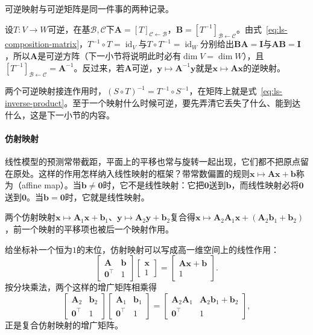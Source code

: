 可逆映射与可逆矩阵是同一件事的两种记录。

设$T:V\to W$可逆，在基$\mathcal B,\mathcal C$下$\bm A=[T]_{\mathcal C\leftarrow\mathcal B}$，$\bm B=[T^{-1}]_{\mathcal B\leftarrow\mathcal C}$。由式~\eqref{eq:ls-composition-matrix}，$T^{-1}\circ T=\operatorname{id}_V$与$T\circ T^{-1}=\operatorname{id}_W$分别给出$\bm B\bm A=\bm I$与$\bm A\bm B=\bm I$，所以$\bm A$是可逆方阵（下一小节将说明此时必有$\dim V=\dim W$），且$[T^{-1}]_{\mathcal B\leftarrow\mathcal C}=\bm A^{-1}$。反过来，若$\bm A$可逆，$\bm y\mapsto\bm A^{-1}\bm y$就是$\bm x\mapsto\bm A\bm x$的逆映射。

两个可逆映射接连作用时，$(S\circ T)^{-1}=T^{-1}\circ S^{-1}$，在矩阵上就是式~\eqref{eq:ls-inverse-product}。至于一个映射什么时候可逆，要先弄清它丢失了什么、能到达什么，这是下一小节的内容。

\paragraph{仿射映射}
\label{sec:ls-affine-maps}
线性模型的预测常带截距，平面上的平移也常与旋转一起出现，它们都不把原点留在原处。这样的作用怎样纳入线性映射的框架？带常数偏置的规则$\bm x\mapsto\bm A\bm x+\bm b$称为（affine map）。当$\bm b\neq\bm0$时，它不是线性映射：它把$\bm0$送到$\bm b$，而线性映射必将$\bm0$送到$\bm0$。当$\bm b=\bm0$时，它就是线性映射。

两个仿射映射$\bm x\mapsto\bm A_1\bm x+\bm b_1$、$\bm y\mapsto\bm A_2\bm y+\bm b_2$复合得$\bm x\mapsto\bm A_2\bm A_1\bm x+(\bm A_2\bm b_1+\bm b_2)$，前一个映射的平移项也被后一个映射作用。

给坐标补一个恒为$1$的末位，仿射映射可以写成高一维空间上的线性作用：
\begin{equation}
 \begin{bmatrix}\bm A&\bm b\\ \bm0^\top&1\end{bmatrix}
 \begin{bmatrix}\bm x\\1\end{bmatrix}
 =
 \begin{bmatrix}\bm A\bm x+\bm b\\1\end{bmatrix}.
 \label{eq:ls-affine-homogeneous}
\end{equation}
按分块乘法，两个这样的增广矩阵相乘得
\[
 \begin{bmatrix}\bm A_2&\bm b_2\\ \bm0^\top&1\end{bmatrix}
 \begin{bmatrix}\bm A_1&\bm b_1\\ \bm0^\top&1\end{bmatrix}
 =\begin{bmatrix}\bm A_2\bm A_1&\bm A_2\bm b_1+\bm b_2\\ \bm0^\top&1\end{bmatrix},
\]
正是复合仿射映射的增广矩阵。

